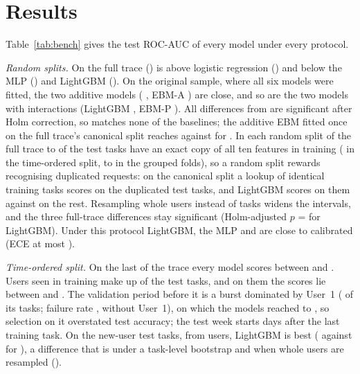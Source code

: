 \section{Results}
\label{sec:results}



Table~\ref{tab:bench} gives the test ROC-AUC of every model under every protocol.

\emph{Random splits.} On the full trace \kaam{} () is above logistic regression () and below the MLP () and LightGBM (). On the original sample, where all six models were fitted, the two additive models (\kaam{} , EBM-A ) are close, and so are the two models with interactions (LightGBM , EBM-P ). All differences from \kaam{} are significant after Holm correction, so \kaam{} matches none of the baselines; the additive EBM fitted once on the full trace's canonical split reaches  against  for \kaam{}. In each random split of the full trace  to  of the test tasks have an exact copy of all ten features in training ( in the time-ordered split,  to  in the grouped folds), so a random split rewards recognising duplicated requests: on the canonical split a lookup of identical training tasks scores  on the duplicated test tasks, and LightGBM scores  on them against  on the rest. Resampling whole users instead of tasks widens the intervals, and the three full-trace differences stay significant (Holm-adjusted $p$ =  for LightGBM). Under this protocol LightGBM, the MLP and \kaam{} are close to calibrated (ECE at most ).

\emph{Time-ordered split.} On the last  of the trace every model scores between  and . Users seen in training make up  of the test tasks, and on them the scores lie between  and . The validation period before it is a burst dominated by User~1 ( of its tasks; failure rate ,  without User~1), on which the models reached  to , so selection on it overstated test accuracy; the test week starts  days after the last training task. On the  new-user test tasks, from  users, LightGBM is best ( against  for \kaam{}), a difference that is  under a task-level bootstrap and  when whole users are resampled ().

